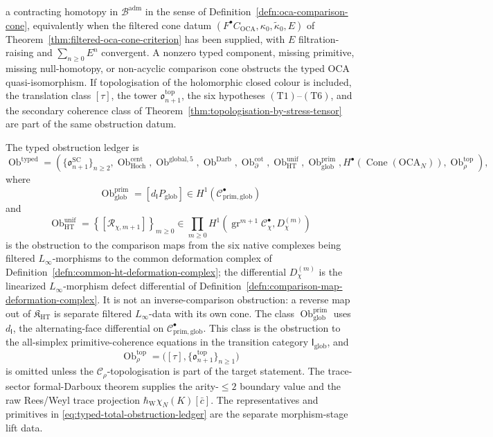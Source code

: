 \begin{thm}
  a contracting homotopy in \(\mathcal B^{\mathrm{adm}}\) in the sense of
  Definition~\ref{defn:oca-comparison-cone}, equivalently when the
  filtered cone datum
  \((F^\bullet C_{\mathrm{OCA}},\kappa_0,\widetilde\kappa_0,E)\) of
  Theorem~\ref{thm:filtered-oca-cone-criterion} has been supplied, with
\(E\) filtration-raising and \(\sum_{n\ge0}E^n\) convergent.  A
nonzero typed component, missing primitive, missing null-homotopy, or
non-acyclic comparison cone obstructs the typed OCA quasi-isomorphism.
If topologisation of the holomorphic closed colour is included, the
translation class \([\tau]\), the tower
\(\mathfrak o^{\mathrm{top}}_{n+1}\), the six hypotheses
\((\mathrm{T1})\)--\((\mathrm{T6})\), and the secondary coherence class
of Theorem~\ref{thm:topologisation-by-stress-tensor} are part of the
same obstruction datum.

The typed obstruction ledger is
\begin{equation}\label{eq:typed-total-obstruction-ledger}
  \operatorname{Ob}^{\mathrm{typed}}
  =
  \left(
    \{\mathfrak o^{\mathrm{SC}}_{n+1}\}_{n\ge2},
    \operatorname{Ob}^{\mathrm{cent}}_{\mathrm{Hoch}},
    \operatorname{Ob}^{\mathrm{global},5},
    \operatorname{Ob}^{\mathrm{Darb}},
    \operatorname{Ob}^{\mathrm{cot}}_\partial,
    \operatorname{Ob}^{\mathrm{unif}}_{\mathrm{HT}},
    \operatorname{Ob}^{\mathrm{prim}}_{\mathrm{glob}},
    H^\bullet\!\left(\operatorname{Cone}(\mathrm{OCA}_N)\right),
    \operatorname{Ob}^{\mathrm{top}}_\rho
  \right),
\end{equation}
where
\[
  \operatorname{Ob}^{\mathrm{prim}}_{\mathrm{glob}}
  =
  [d_{\mathsf I}P_{\mathrm{glob}}]
  \in H^1(\mathcal C^\bullet_{\mathrm{prim,glob}})
\]
and
\[
  \operatorname{Ob}^{\mathrm{unif}}_{\mathrm{HT}}
  =
  \left\{[\mathcal R_{\chi,m+1}]\right\}_{m\ge0}
  \in
  \prod_{m\ge0}
  H^1\!\left(
    \operatorname{gr}^{m+1}\mathcal C^\bullet_\chi,
    D^{(m)}_\chi\right)
\]
is the obstruction to the comparison maps from the six native complexes
being filtered \(L_\infty\)-morphisms to the common deformation complex of
Definition~\ref{defn:common-ht-deformation-complex}; the differential
\(D^{(m)}_\chi\) is the linearized \(L_\infty\)-morphism defect differential of
Definition~\ref{defn:comparison-map-deformation-complex}.  It is not an
inverse-comparison obstruction: a reverse map out of
\(\mathfrak K_{\mathrm{HT}}\) is separate filtered \(L_\infty\)-data
with its own cone.  The class
\(\operatorname{Ob}^{\mathrm{prim}}_{\mathrm{glob}}\) uses
\(d_{\mathsf I}\), the alternating-face differential on
\(\mathcal C^\bullet_{\mathrm{prim,glob}}\).  This class is the
obstruction to the all-simplex primitive-coherence equations in the
transition category \(\mathsf I_{\mathrm{glob}}\), and
\[
  \operatorname{Ob}^{\mathrm{top}}_\rho
  =
  \bigl([\tau],\{\mathfrak o^{\mathrm{top}}_{n+1}\}_{n\ge1}\bigr)
\]
is omitted unless the \(\mathcal C_\rho\)-topologisation is part of the
target statement.  The trace-sector formal-Darboux theorem supplies the
arity-\(\le2\) boundary value and the raw Rees/Weyl trace projection
\(\hbar_{\mathrm W}\chi_N(K)[\bar c]\).  The
representatives and primitives in
\eqref{eq:typed-total-obstruction-ledger} are the separate
morphism-stage lift data.


\end{thm}
